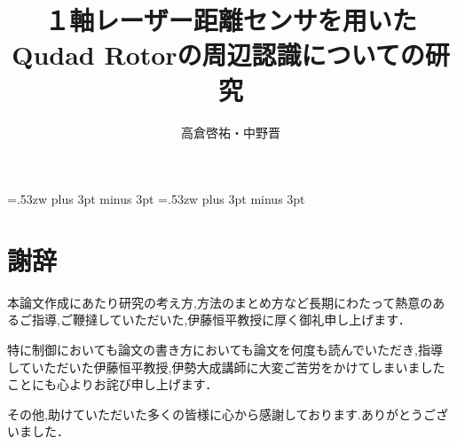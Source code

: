 \documentclass[12pt,oneside]{paper}
\title{１軸レーザー距離センサを用いたQudad Rotorの周辺認識についての研究}
\author{高倉啓祐・中野晋}
\begin{document}
\setlength{\baselineskip}{9truemm}

\kanjiskip=.53zw plus 3pt minus 3pt
\xkanjiskip=.53zw plus 3pt minus 3pt

\tableofcontents

















\chapter*{謝辞}
本論文作成にあたり研究の考え方,方法のまとめ方など長期にわたって熱意のあるご指導,ご鞭撻していただいた,伊藤恒平教授に厚く御礼申し上げます．

特に制御においても論文の書き方においても論文を何度も読んでいただき,指導していただいた伊藤恒平教授,伊勢大成講師に大変ご苦労をかけてしまいましたことにも心よりお詫び申し上げます．

その他,助けていただいた多くの皆様に心から感謝しております.ありがとうございました．

\appendix

\end{document}
